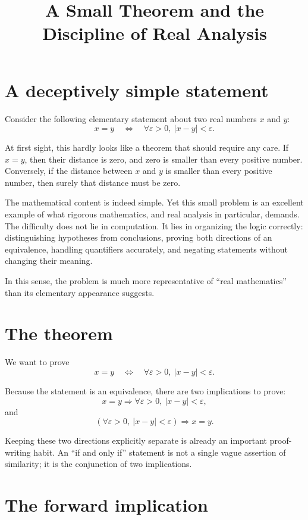 \documentclass{essay}
\title{A Small Theorem and the Discipline of Real Analysis}
\author{}
\date{}
\begin{document}
\maketitle

\section{A deceptively simple statement}

Consider the following elementary statement about two real numbers \(x\) and \(y\):
\[
x=y
\quad\Longleftrightarrow\quad
\forall \varepsilon>0,\ |x-y|<\varepsilon.
\]

At first sight, this hardly looks like a theorem that should require any care. If \(x=y\), then their distance is zero, and zero is smaller than every positive number. Conversely, if the distance between \(x\) and \(y\) is smaller than every positive number, then surely that distance must be zero.

The mathematical content is indeed simple. Yet this small problem is an excellent example of what rigorous mathematics, and real analysis in particular, demands. The difficulty does not lie in computation. It lies in organizing the logic correctly: distinguishing hypotheses from conclusions, proving both directions of an equivalence, handling quantifiers accurately, and negating statements without changing their meaning.

In this sense, the problem is much more representative of ``real mathematics'' than its elementary appearance suggests.

\section{The theorem}

We want to prove
\[
x=y
\quad\Longleftrightarrow\quad
\forall \varepsilon>0,\ |x-y|<\varepsilon.
\]

Because the statement is an equivalence, there are two implications to prove:
\[
x=y
\Longrightarrow
\forall \varepsilon>0,\ |x-y|<\varepsilon,
\]
and
\[
\left(\forall \varepsilon>0,\ |x-y|<\varepsilon\right)
\Longrightarrow
x=y.
\]

Keeping these two directions explicitly separate is already an important proof-writing habit. An ``if and only if'' statement is not a single vague assertion of similarity; it is the conjunction of two implications.

\section{The forward implication}
\end{document}
